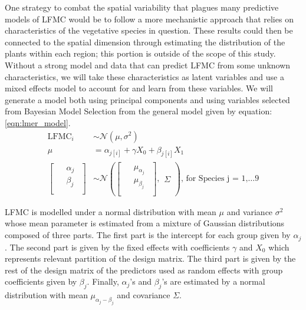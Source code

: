 \documentclass[twocolumn,10pt]{article}
\begin{document}
One strategy to combat the spatial variability that plagues many predictive models of LFMC would be to follow a more mechanistic approach that relies on characteristics of the vegetative species in question. These results could then be connected to the spatial dimension through estimating the distribution of the plants within each region; this portion is outside of the scope of this study. Without a strong model and data that can predict LFMC from some unknown characteristics, we will take these characteristics as latent variables and use a mixed effects model to account for and learn from these variables. We will generate a model both using principal components and using variables selected from Bayesian Model Selection from the general model given by equation: \ref{eqn:lmer_model}. 
\begin{equation}
\begin{aligned}
  \operatorname{LFMC}_{i}  &\sim \mathcal{N} \left(\mu, \sigma^2 \right) \\
  \mu &=\alpha_{j[i]} + \gamma X_{0} +  \beta_{j[i]}X_{1} \\
\left[
  \begin{array}{c} 
    \begin{aligned}
      &\alpha_{j} \\
      &\beta_{j} \\
    \end{aligned}
  \end{array}
\right]
  &\sim \mathcal{N} \left(
\left[
  \begin{array}{c} 
    \begin{aligned}
      &\mu_{\alpha_{j}} \\
      &\mu_{\beta_{j}} \\
    \end{aligned}
  \end{array}
\right]
, 
  \begin{array}{c}
     \Sigma
  \end{array}
 \right)
    \text{, for Species j = 1,} \dots 9
\end{aligned}
\label{eqn:lmer_model}
\end{equation}

LFMC is modelled under a normal distribution with mean $\mu$ and variance $\sigma^{2}$ whose mean parameter is estimated from a mixture of Gaussian distributions composed of three parts. The first part is the intercept for each group given by $\alpha_{j}$. The second part is given by the fixed effects with coefficients $\gamma$ and $X_{0}$ which represents relevant partition of the design matrix. The third part is given by the rest of the design matrix of the predictors used as random effects with group coefficients given by $\beta_{j}$. Finally, $\alpha_{j}$'s and $\beta_{j}$'s are estimated by a normal distribution with mean $\mu_{\alpha_{j} - \beta_{j}}$ and covariance $\Sigma$. \\
\end{document}
